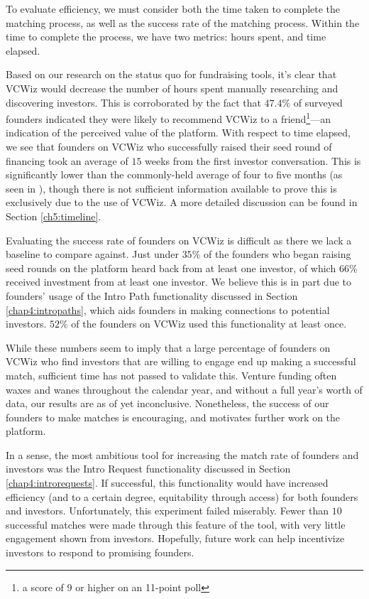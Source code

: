 To evaluate efficiency, we must consider both the time taken to complete the matching process, as well as the success rate of the matching process. Within the time to complete the process, we have two metrics: hours spent, and time elapsed.

Based on our research on the status quo for fundraising tools, it's clear that VCWiz would decrease the number of hours spent manually researching and discovering investors. This is corroborated by the fact that $47.4\%$ of surveyed founders indicated they were likely to recommend VCWiz to a friend\footnote{a score of 9 or higher on an 11-point poll}---an indication of the perceived value of the platform. With respect to time elapsed, we see that founders on VCWiz who successfully raised their seed round of financing took an average of $15$ weeks from the first investor conversation. This is significantly lower than the commonly-held average of four to five months (as seen in \cite{BRUNO198561}), though there is not sufficient information available to prove this is exclusively due to the use of VCWiz. A more detailed discussion can be found in Section \ref{ch5:timeline}.

Evaluating the success rate of founders on VCWiz is difficult as there we lack a baseline to compare against. Just under $35\%$ of the founders who began raising seed rounds on the platform heard back from at least one investor, of which $66\%$ received investment from at least one investor. We believe this is in part due to founders' usage of the Intro Path functionality discussed in Section \ref{chap4:intropaths}, which aids founders in making connections to potential investors. $52\%$ of the founders on VCWiz used this functionality at least once.

While these numbers seem to imply that a large percentage of founders on VCWiz who find investors that are willing to engage end up making a successful match, sufficient time has not passed to validate this. Venture funding often waxes and wanes throughout the calendar year, and without a full year's worth of data, our results are as of yet inconclusive. Nonetheless, the success of our founders to make matches is encouraging, and motivates further work on the platform.

In a sense, the most ambitious tool for increasing the match rate of founders and investors was the Intro Request functionality discussed in Section \ref{chap4:introrequests}. If successful, this functionality would have increased efficiency (and to a certain degree, equitability through access) for both founders and investors. Unfortunately, this experiment failed miserably. Fewer than $10$ successful matches were made through this feature of the tool, with very little engagement shown from investors. Hopefully, future work can help incentivize investors to respond to promising founders.
